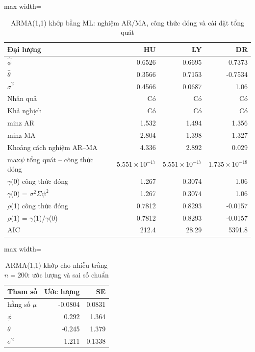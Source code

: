 \begin{table}[H]
\centering\footnotesize
\caption{ARMA(1,1) khớp bằng ML: nghiệm AR/MA, công thức đóng và cài đặt tổng quát}\label{tab:tab_b11_10_arma11}
\begin{adjustbox}{max width=\linewidth}
\begin{tabular}{|l|r|r|r|}
\toprule
Đại lượng & HU & LY & DR \\
\midrule
$\hat{\phi}$ & 0.6526 & 0.6695 & 0.7373 \\
$\hat{\theta}$ & 0.3566 & 0.7153 & -0.7534 \\
$\hat{\sigma}^{2}$ & 0.4566 & 0.0687 & 1.06 \\
Nhân quả & Có & Có & Có \\
Khả nghịch & Có & Có & Có \\
min\textbar{}z\textbar{} AR & 1.532 & 1.494 & 1.356 \\
min\textbar{}z\textbar{} MA & 2.804 & 1.398 & 1.327 \\
Khoảng cách nghiệm AR–MA & 4.336 & 2.892 & 0.029 \\
max\textbar{}$\psi$ tổng quát – công thức đóng\textbar{} & $5.551\times10^{-17}$ & $5.551\times10^{-17}$ & $1.735\times10^{-18}$ \\
$\gamma$(0) công thức đóng & 1.267 & 0.3074 & 1.06 \\
$\gamma$(0) = $\sigma^{2}\Sigma\psi^{2}$ & 1.267 & 0.3074 & 1.06 \\
$\rho$(1) công thức đóng & 0.7812 & 0.8293 & -0.0157 \\
$\rho$(1) = $\gamma$(1)/$\gamma$(0) & 0.7812 & 0.8293 & -0.0157 \\
AIC & 212.4 & 28.29 & 5391.8 \\
\bottomrule
\end{tabular}
\end{adjustbox}
\end{table}
\begin{table}[H]
\centering\footnotesize
\caption{ARMA(1,1) khớp cho nhiễu trắng $n=200$: ước lượng và sai số chuẩn}\label{tab:tab_b11_10_overparameterized}
\begin{adjustbox}{max width=\linewidth}
\begin{tabular}{|l|r|r|}
\toprule
Tham số & Ước lượng & SE \\
\midrule
hằng số $\mu$ & -0.0804 & 0.0831 \\
$\phi$ & 0.292 & 1.364 \\
$\theta$ & -0.245 & 1.379 \\
$\sigma^{2}$ & 1.211 & 0.1338 \\
\bottomrule
\end{tabular}
\end{adjustbox}
\end{table}
